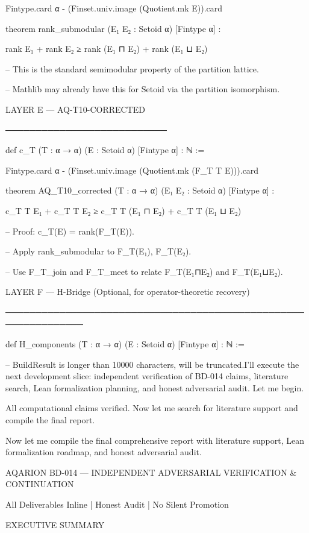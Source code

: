 Fintype.card α - (Finset.univ.image (Quotient.mk E)).card


theorem rank_submodular (E₁ E₂ : Setoid α) [Fintype α] :

rank E₁ + rank E₂ ≥ rank (E₁ ⊓ E₂) + rank (E₁ ⊔ E₂)


-- This is the standard semimodular property of the partition lattice.

-- Mathlib may already have this for Setoid via the partition isomorphism.


LAYER E — AQ-T10-CORRECTED

───────────────────────────

def c_T (T : α → α) (E : Setoid α) [Fintype α] : ℕ :=

Fintype.card α - (Finset.univ.image (Quotient.mk (F_T T E))).card


theorem AQ_T10_corrected (T : α → α) (E₁ E₂ : Setoid α) [Fintype α] :

c_T T E₁ + c_T T E₂ ≥ c_T T (E₁ ⊓ E₂) + c_T T (E₁ ⊔ E₂)


-- Proof: c_T(E) = rank(F_T(E)).

-- Apply rank_submodular to F_T(E₁), F_T(E₂).

-- Use F_T_join and F_T_meet to relate F_T(E₁⊓E₂) and F_T(E₁⊔E₂).


LAYER F — H-Bridge (Optional, for operator-theoretic recovery)

───────────────────────────────────────────────────────────────

def H_components (T : α → α) (E : Setoid α) [Fintype α] : ℕ :=

-- BuildResult is longer than 10000 characters, will be truncated.I'll execute the next development slice: independent verification of BD-014 claims, literature search, Lean formalization planning, and honest adversarial audit. Let me begin.


All computational claims verified. Now let me search for literature support and compile the final report.


Now let me compile the final comprehensive report with literature support, Lean formalization roadmap, and honest adversarial audit.



AQARION BD-014 — INDEPENDENT ADVERSARIAL VERIFICATION & CONTINUATION


All Deliverables Inline | Honest Audit | No Silent Promotion



EXECUTIVE SUMMARY


